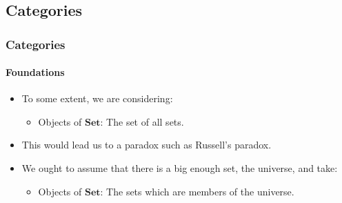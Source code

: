 \documentclass{beamer}
\newcommand{\catbf}[1]{\ensuremath{\mathbf{#1}}\xspace}
\newcommand{\set}{\catbf{Set}}
\begin{document}

\appendix
\section{\appendixname}



\subsection{Categories}


\begin{frame}[label={re:foundations}]
  \frametitle{Categories}
  \framesubtitle{Foundations}

  \begin{itemize}
  \item
    To some extent, we are considering:
    \begin{itemize}
    \item
      Objects of \set: The set of all sets.
    \end{itemize}
  \item
    This would lead us to a paradox such as Russell's paradox.
  \end{itemize}
  \begin{itemize}
  \item
    We ought to assume that there is a big enough set, the universe,
    and take:
    \begin{itemize}
    \item
      Objects of \set: The sets which are members of the universe.
    \end{itemize}
  \end{itemize}
  \vfill\hfill\hyperlink{ex:set}{}

\end{frame}

\end{document}

